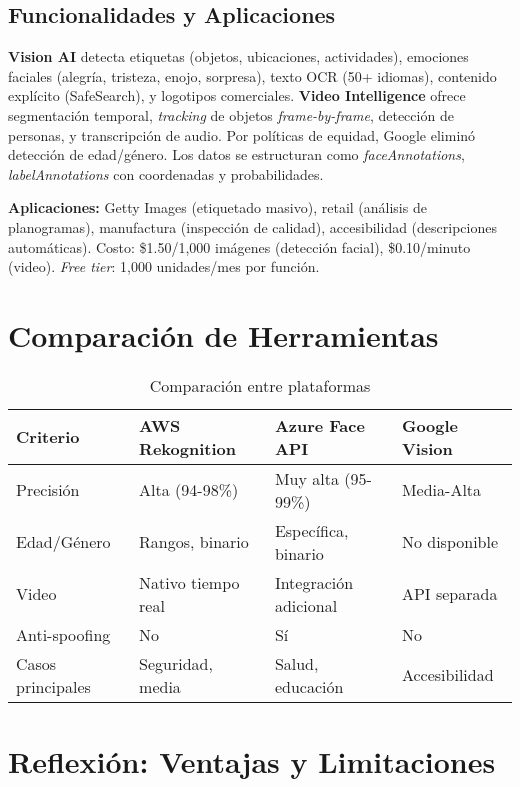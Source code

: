 \documentclass[12pt,a4paper]{article}
\begin{document}
\subsection{Funcionalidades y Aplicaciones}
\textbf{Vision AI} detecta etiquetas (objetos, ubicaciones, actividades), emociones faciales (alegría, tristeza, enojo, sorpresa), texto OCR (50+ idiomas), contenido explícito (SafeSearch), y logotipos comerciales. \textbf{Video Intelligence} ofrece segmentación temporal, \textit{tracking} de objetos \textit{frame-by-frame}, detección de personas, y transcripción de audio. Por políticas de equidad, Google eliminó detección de edad/género. Los datos se estructuran como \textit{faceAnnotations}, \textit{labelAnnotations} con coordenadas y probabilidades.

\textbf{Aplicaciones:} Getty Images (etiquetado masivo), retail (análisis de planogramas), manufactura (inspección de calidad), accesibilidad (descripciones automáticas). Costo: \$1.50/1,000 imágenes (detección facial), \$0.10/minuto (video). \textit{Free tier}: 1,000 unidades/mes por función.

\section{Comparación de Herramientas}

\begin{table}[h!]
\centering
\footnotesize
\begin{tabular}{@{}p{2.5cm}p{3.2cm}p{3.2cm}p{3.2cm}@{}}
\toprule
\textbf{Criterio} & \textbf{AWS Rekognition} & \textbf{Azure Face API} & \textbf{Google Vision} \\ \midrule
Precisión & Alta (94-98\%) & Muy alta (95-99\%) & Media-Alta \\
Edad/Género & Rangos, binario & Específica, binario & No disponible \\
Video & Nativo tiempo real & Integración adicional & API separada \\
Anti-spoofing & No & Sí & No \\
Casos principales & Seguridad, media & Salud, educación & Accesibilidad \\ \bottomrule
\end{tabular}
\caption{Comparación entre plataformas}
\end{table}

\section{Reflexión: Ventajas y Limitaciones}
\end{document}
